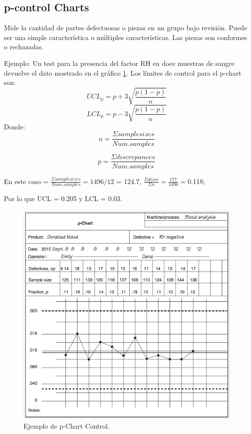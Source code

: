 \documentclass[oneside]{book}
\begin{document}
\subsection{p-control Charts}
Mide la cantidad de partes defectuosas o piezas en un grupo bajo revisión. Puede ser una simple característica o múltiples características. 
Las piezas son conformes o rechazadas. 

Ejemplo: Un test para la presencia del factor RH en doce muestras de sangre devuelve el dato mostrado en el gráfico \ref{fig:pChartEjemplo}.
Los límites de control para el p-chart son:
\begin{equation}
UCL_p = p + 3 \sqrt{\frac{p(1-p)}{n}}
\end{equation}
\begin{equation}
LCL_p = p - 3 \sqrt{\frac{p(1-p)}{n}}
\end{equation}
Donde:
\begin{equation}
n = \frac{\Sigma sample sizes}{Num. samples}
\end{equation}

\begin{equation}
p = \frac{\Sigma discrepances}{Num. samples}
\end{equation}

En este caso = $\frac{\Sigma sample sizes}{Num. samples} = 1496 / 12$ = 124.7, $\frac{\Sigma discr}{\Sigma n} = \frac{177}{1496} = $0.118;

Por lo que UCL = 0.205 y LCL = 0.03.

\begin{figure}[H]
	\centering
	\includegraphics[width=120mm]{imagenes/pChartEjemplo.png}
	\caption{Ejemplo de p-Chart Control.}
	\label{fig:pChartEjemplo}
\end{figure}
\end{document}
